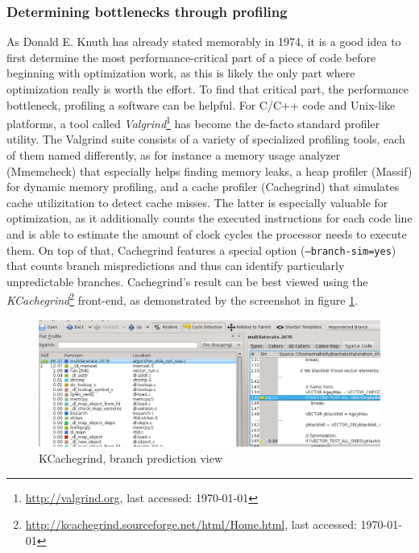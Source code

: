 \subsubsection{Determining bottlenecks through profiling}
As Donald E. Knuth has already stated memorably in 1974, it is a good idea to first determine the most performance-critical part of a piece of code before beginning with optimization work, as this is likely the only part where optimization really is worth the effort. To find that critical part, the performance bottleneck, profiling a software can be helpful. For C/C++ code and Unix-like platforms, a tool called \emph{Valgrind}\footnote{\url{http://valgrind.org}, last accessed: \today{}} has become the de-facto standard profiler utility. The Valgrind suite consists of a variety of specialized profiling tools, each of them named differently, as for instance a memory usage analyzer (Mmemcheck) that especially helps finding memory leaks, a heap profiler (Massif) for dynamic memory profiling, and a cache profiler (Cachegrind) that simulates cache utilizitation to detect cache misses. The latter is especially valuable for optimization, as it additionally counts the executed instructions for each code line and is able to estimate the amount of clock cycles the processor needs to execute them. On top of that, Cachegrind features a special option (\texttt{--branch-sim=yes}) that counts branch mispredictions and thus can identify particularly unpredictable branches. Cachegrind's result can be best viewed using the \emph{KCachegrind}\footnote{\url{http://kcachegrind.sourceforge.net/html/Home.html}, last accessed: \today{}} front-end, as demonstrated by the screenshot in figure \ref{fig:kcachegrind}.
\begin{figure}[h]
\begin{center}
\includegraphics[width=14cm]{img/kcachegrind}
\end{center}
\caption{KCachegrind, branch prediction view}
\label{fig:kcachegrind}
\end{figure}

